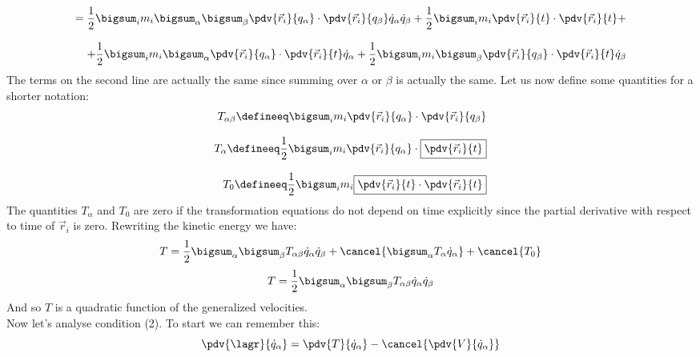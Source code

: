 \begin{equation}
    \begin{split}
        = \dfrac{1}{2}\bigsum_i m_i \bigsum_{\alpha}\bigsum_{\beta}\pdv{ \vec{r}_i}{ q_{\alpha}}\cdot\pdv{ \vec{r}_i}{ q_{\beta}}\dot{q}_{\alpha}\dot{q}_{\beta} + \dfrac{1}{2}\bigsum_i m_i \pdv{ \vec{r}_i}{ t} \cdot \pdv{ \vec{r}_i}{ t} +\\[8pt]
        + \dfrac{1}{2}\bigsum_i m_i \bigsum_{\alpha}\pdv{ \vec{r}_i}{ q_{\alpha}} \cdot \pdv{ \vec{r}_i}{ t} \dot{q}_{\alpha} + \dfrac{1}{2}\bigsum_i m_i \bigsum_{\beta}\pdv{ \vec{r}_i}{ q_{\beta}} \cdot \pdv{ \vec{r}_i}{ t}\dot{q}_{\beta}
    \end{split}
\end{equation}
The terms on the second line are actually the same since summing over $\alpha$ or $\beta$ is actually the same. Let us now define some quantities for a shorter notation:
\begin{equation}
    \begin{split}
        T_{\alpha \beta} \defineeq \bigsum_i m_i \pdv{ \vec{r}_i}{ q_{\alpha}}\cdot\pdv{ \vec{r}_i}{ q_{\beta}}\\[8pt]
        T_{\alpha} \defineeq \dfrac{1}{2} \bigsum_i m_i \pdv{ \vec{r}_i}{ q_{\alpha}} \cdot \boxed{\pdv{ \vec{r}_i}{ t}}\\[8pt]
        T_0 \defineeq \dfrac{1}{2}\bigsum_i m_i \boxed{\pdv{ \vec{r}_i}{ t} \cdot \pdv{ \vec{r}_i}{ t}}
    \end{split}
\end{equation}
The quantities $T_{\alpha}$ and $T_0$ are zero if the transformation equations do not depend on time explicitly since the partial derivative with respect to time of $\vec{r}_i$ is zero. Rewriting the kinetic energy we have:
\begin{equation}
    T = \dfrac{1}{2}\bigsum_{\alpha}\bigsum_{\beta}T_{\alpha \beta}\dot{q}_{\alpha}\dot{q}_{\beta} + \cancel{\bigsum_{\alpha}T_{\alpha}\dot{q}_{\alpha}} + \cancel{T_0}
\end{equation}
\begin{equation} \label{e:kinetic_energy}
    T = \dfrac{1}{2}\bigsum_{\alpha}\bigsum_{\beta}T_{\alpha \beta}\dot{q}_{\alpha}\dot{q}_{\beta}
\end{equation}
And so $T$ is a quadratic function of the generalized velocities.\\
Now let's analyse condition (2). To start we can remember this:
\begin{equation}
    \pdv{\lagr}{\dot{q}_{\alpha}} = \pdv{ T}{ \dot{q}_{\alpha}} - \cancel{\pdv{V}{\dot{q}_{\alpha}}}
\end{equation}
